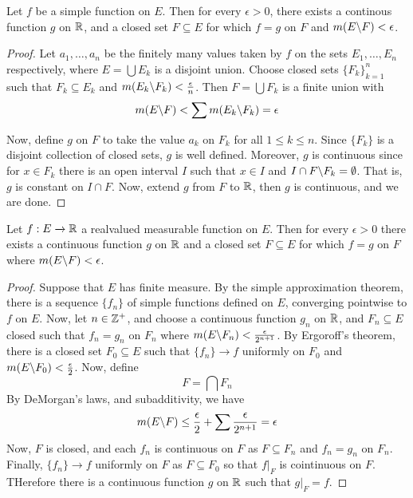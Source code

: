 \begin{theorem}\label{9.3.3}
    Let $f$ be a simple function on  $E$. Then for every  $\epsilon>0$, there
    exists a continous function  $g$ on  $\mathbb{R}$, and a closed set $F \subseteq E$
    for which  $f=g$ on  $F$ and  $m(E \backslash F)<\epsilon$.
\end{theorem}
\begin{proof}
    Let $a_1, \dots, a_n$ be the finitely many values taken by $f$ on the sets
    $E_1, \dots, E_n$ respectively, where $E=\bigcup{E_k}$ is a disjoint union.
    Choose closed sets $\{F_k\}_{k=1}^n$ such that $F_k \subseteq E_k$ and
    $m(E_k \backslash F_k)<\frac{\epsilon}{n}$. Then $F=\bigcup{F_k}$ is a finite
    union with
    \begin{equation*}
        m(E \backslash F)<\sum{m(E_k \backslash F_k)}=\epsilon
    \end{equation*}

    Now, define $g$ on  $F$ to take the value $a_k$ on $F_k$ for all $1 \leq k
    \leq n$. Since  $\{F_k\}$ is a disjoint collection of closed sets, $g$ is
    well defined. Moreover,  $g$ is continuous since for  $x \in F_k$ there is
    an open interval $I$  such that $x \in I$ and  $I \cap
    F \backslash F_k=\emptyset$. That is, $g$ is constant on $I \cap F$. Now, extend
    $g$ from  $F$ to $\mathbb{R}$, then $g$ is continuous, and we are done.
\end{proof}

\begin{theorem}\label{9.3.4}
    Let $f:E \xrightarrow{} \mathbb{R}$ a realvalued measurable function on $E$. Then
    for every  $\epsilon>0$ there exists a continuous function $g$ on $\mathbb{R}$ and
    a closed set  $F \subseteq E$ for which $f=g$ on $F$ where
    $m(E \backslash F)<\epsilon$.
\end{theorem}
\begin{proof}
    Suppose that $E$ has finite measure. By the simple approximation theorem,
    there is a sequence  $\{f_n\}$ of simple functions defined on $E$,
    converging pointwise to  $f$ on $E$. Now, let $n \in \mathbb{Z}^+$, and choose a
    continuous function $g_n$ on  $\mathbb{R}$, and $F_n \subseteq E$ closed such that
    $f_n=g_n$ on  $F_n$ where  $m(E \backslash F_n)<\frac{\epsilon}{2^{n+1}}$. By
    Ergoroff's theorem, there is a closed set $F_0 \subseteq E$ such that
    $\{f_n\} \xrightarrow{} f$ uniformly on $F_0$ and
    $m(E \backslash F_0)<\frac{\epsilon}{2}$. Now, define
    \begin{equation*}
        F=\bigcap{F_n}
    \end{equation*}
    By DeMorgan's laws, and subadditivity, we have
    \begin{equation*}
        m(E \backslash F) \leq
        \frac{\epsilon}{2}+\sum{\frac{\epsilon}{2^{n+1}}}=\epsilon
    \end{equation*}
    Now, $F$ is closed, and each  $f_n$ is continuous on  $F$ as  $F \subseteq
    F_n$ and  $f_n=g_n$ on  $F_n$. Finally,  $\{f_n\} \xrightarrow{} f$
    uniformly on $F$ as  $F \subseteq F_0$ so that $f|_F$ is cointinuous on $F$.
    THerefore there is a continuous function $g$ on $\mathbb{R}$ such that $g|_F=f$.
\end{proof}
